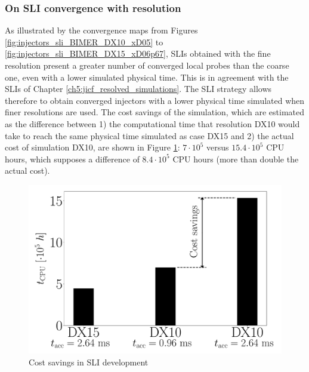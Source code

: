 

\clearpage

\subsubsection*{On SLI convergence with resolution}


As illustrated by the convergence maps from Figures \ref{fig:injectors_sli_BIMER_DX10_xD05} to \ref{fig:injectors_sli_BIMER_DX15_xD06p67}, SLIs obtained with the fine resolution present a greater number of converged local probes than the coarse one, even with a lower simulated physical time. This is in agreement with the SLIs of Chapter \ref{ch5:jicf_resolved_simulations}. The SLI strategy allows therefore to obtain converged injectors with a lower physical time simulated when finer resolutions are used. The cost savings of the simulation, which are estimated as the difference between 1) the computational time that resolution DX10 would take to reach the same physical time simulated as case DX15 and 2) the actual cost of simulation DX10, are shown in Figure \ref{fig:BIMER_costs_bar_graphs_cost_savints}: $7 \cdot 10^5$ versus $15.4 \cdot 10^5$ CPU hours, which supposes a difference of $8.4 \cdot 10^5$ CPU hours (more than double the actual cost). %


\begin{figure}[ht]
	\centering
   \includegraphics[scale=0.22]{./part3_applications/figures_ch8_resolved/SLI_cost_for_convergence/cost_savings_simulations}
	\caption{Cost savings in SLI development}
   \label{fig:BIMER_costs_bar_graphs_cost_savints}
\end{figure}




